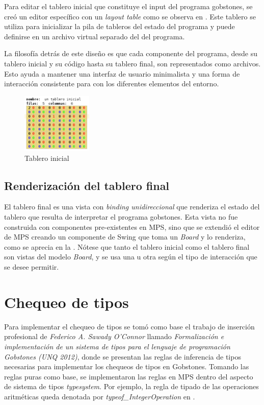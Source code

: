 Para editar el tablero inicial que constituye el input del programa gobstones, se creó un editor específico con un \textit{layout table} como se observa en . Este tablero se utiliza para inicializar la pila de tableros del estado del programa y puede definirse en un archivo virtual separado del del programa. 

La filosofía detrás de este diseño es que cada componente del programa, desde su tablero inicial y su código hasta su tablero final, son representados como archivos. Esto ayuda a mantener una interfaz de usuario minimalista y una forma de interacción consistente para con los diferentes elementos del entorno.

\begin{figure}[hb]
\centering
\includegraphics[width=0.3\textwidth]{assets/initial_board}
\caption{Tablero inicial}
\label{fig:initial_board}
\end{figure}


\subsection{Renderización del tablero final}

El tablero final es una vista con \textit{binding unidireccional} que renderiza el estado del tablero que resulta de interpretar el programa gobstones. Esta vista no fue construida con componentes pre-existentes en MPS, sino que se extendió el editor de MPS creando un componente de Swing\cite{swing} que toma un \textit{Board} y lo renderiza, como se aprecia en la . Nótese que tanto el tablero inicial como el tablero final son vistas del modelo \textit{Board}, y se usa una u otra según el tipo de interacción que se desee permitir.



\section{Chequeo de tipos}\label{chequeo}

Para implementar el chequeo de tipos se tomó como base el trabajo de inserción profesional de \textit{Federico A. Sawady O’Connor} llamado \textit{Formalización e implementación de un sistema de tipos para el lenguaje de programación Gobstones (UNQ 2012)}, donde se presentan las reglas de inferencia de tipos necesarias para implementar los chequeos de tipos en Gobstones. 
Tomando las reglas puras como base, se implementaron las reglas en MPS dentro del aspecto de sistema de tipos \textit{typesystem}. Por ejemplo, la regla de tipado de las operaciones aritméticas queda denotada por \textit{typeof\_IntegerOperation} en .

